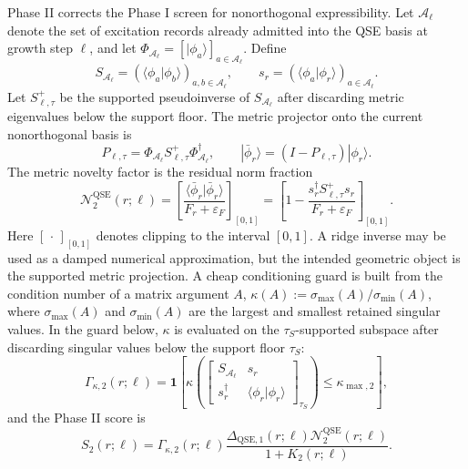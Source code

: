 \documentclass[
  reprint,
  amsmath,
  amssymb,
  aps,
  pra,
  nofootinbib,
  superscriptaddress,
  floatfix
]{revtex4-2}
\newcommand{\Acal}{\mathcal{A}}
\newcommand{\qse}{\mathrm{QSE}}
\newcommand{\eps}{\varepsilon}
\newcommand{\ket}[1]{|#1\rangle}
\newcommand{\braket}[2]{\langle #1|#2\rangle}
\begin{document}
Phase II corrects the Phase I screen for nonorthogonal expressibility.  Let $\Acal_\ell$ denote the set of excitation records already admitted into the QSE basis at growth step $\ell$, and let $\Phi_{\Acal_\ell}=[\ket{\phi_a}]_{a\in\Acal_\ell}$.  Define
\begin{equation}
S_{\Acal_\ell}=(\braket{\phi_a}{\phi_b})_{a,b\in\Acal_\ell},
\qquad
s_r=(\braket{\phi_a}{\phi_r})_{a\in\Acal_\ell}.
\label{eq:qse_overlap_parts}
\end{equation}
Let $S_{\ell,\tau}^{+}$ be the supported pseudoinverse of $S_{\Acal_\ell}$ after discarding metric eigenvalues below the support floor.  The metric projector onto the current nonorthogonal basis is
\begin{equation}
P_{\ell,\tau}
=
\Phi_{\Acal_\ell}S_{\ell,\tau}^{+}\Phi_{\Acal_\ell}^{\dagger},
\qquad
\ket{\bar\phi_r}=(I-P_{\ell,\tau})\ket{\phi_r}.
\label{eq:qse_metric_projector}
\end{equation}
The metric novelty factor is the residual norm fraction
\begin{equation}
\mathcal N_2^{\qse}(r;\ell)
=
\left[
\frac{\braket{\bar\phi_r}{\bar\phi_r}}
{F_r+\eps_F}
\right]_{[0,1]}
=
\left[
1-\frac{s_r^\dagger S_{\ell,\tau}^{+}s_r}
{F_r+\eps_F}
\right]_{[0,1]} .
\label{eq:qse_phase2_novelty}
\end{equation}
Here $[\,\cdot\,]_{[0,1]}$ denotes clipping to the interval $[0,1]$.  A ridge inverse may be used as a damped numerical approximation, but the intended geometric object is the supported metric projection.
A cheap conditioning guard is built from the condition number of a matrix argument $A$,
$\kappa(A):=\sigma_{\max}(A)/\sigma_{\min}(A)$, where $\sigma_{\max}(A)$ and $\sigma_{\min}(A)$ are the largest and smallest retained singular values.  In the guard below, $\kappa$ is evaluated on the $\tau_S$-supported subspace after discarding singular values below the support floor $\tau_S$:
\begin{equation}
\Gamma_{\kappa,2}(r;\ell)=
\mathbf 1\!\left[
\kappa\!\left(
\begin{bmatrix}
S_{\Acal_\ell}&s_r\\
s_r^\dagger&\braket{\phi_r}{\phi_r}
\end{bmatrix}_{\tau_S}
\right)
\le\kappa_{\max,2}
\right],
\label{eq:qse_phase2_condition_guard}
\end{equation}
and the Phase II score is
\begin{equation}
S_2(r;\ell)=
\Gamma_{\kappa,2}(r;\ell)
\frac{\Delta_{\qse,1}(r;\ell)\mathcal N_2^{\qse}(r;\ell)}
{1+K_2(r;\ell)}.
\label{eq:qse_phase2_score}
\end{equation}
\end{document}
